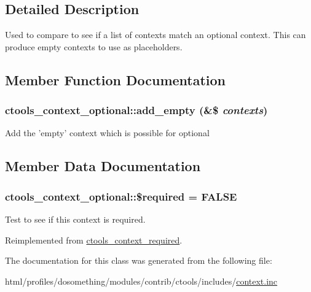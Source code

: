 \subsection{Detailed Description}
Used to compare to see if a list of contexts match an optional context. This can produce empty contexts to use as placeholders. 

\subsection{Member Function Documentation}
\hypertarget{classctools__context__optional_a418c9ddf85538ff466e504f56be250b5}{
\subsubsection[{add\_\-empty}]{\setlength{\rightskip}{0pt plus 5cm}ctools\_\-context\_\-optional::add\_\-empty (\&\$ {\em contexts})}}
\label{classctools__context__optional_a418c9ddf85538ff466e504f56be250b5}
Add the 'empty' context which is possible for optional 

\subsection{Member Data Documentation}
\hypertarget{classctools__context__optional_ad0c01a0afda900501e6679ce51408737}{
\subsubsection[{\$required}]{\setlength{\rightskip}{0pt plus 5cm}ctools\_\-context\_\-optional::\$required = FALSE}}
\label{classctools__context__optional_ad0c01a0afda900501e6679ce51408737}
Test to see if this context is required. 

Reimplemented from \hyperlink{classctools__context__required_a392adc1ecb046f17494d848d9fd02a66}{ctools\_\-context\_\-required}.

The documentation for this class was generated from the following file:\begin{DoxyCompactItemize}
\item 
html/profiles/dosomething/modules/contrib/ctools/includes/\hyperlink{context_8inc}{context.inc}\end{DoxyCompactItemize}
